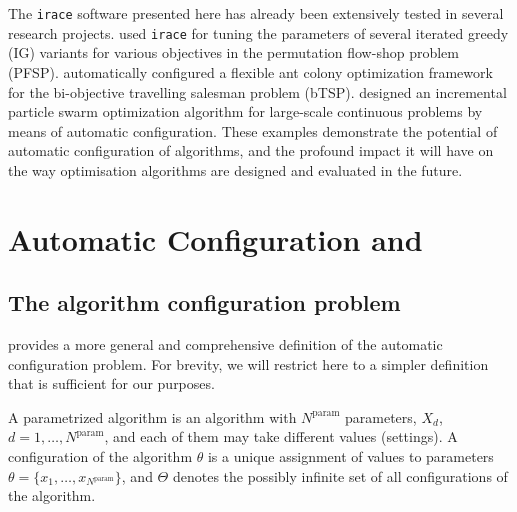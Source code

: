 \documentclass[a4paper]{article}
\newcommand{\irace}{\texttt{irace}\xspace}
\newcommand{\IFRACE}{\text{I/F-Race}\xspace}
\newcommand{\Nparam}{\ensuremath{{N^\text{param}}}\xspace}
\begin{document}
The \irace software presented here has already been extensively tested
in several research projects. \citet{IRIDIA-2010-022,DubLopStu2011cor}
used \irace for tuning the parameters of several iterated greedy (IG)
variants for various objectives in the permutation flow-shop problem
(PFSP). \citet{LopStu2010:ants} automatically configured a flexible
ant colony optimization framework for the bi-objective travelling salesman
problem (bTSP). \citet{MonAydStu2011soco} designed an incremental particle swarm optimization algorithm for large-scale continuous problems by means of automatic configuration.
%
These examples demonstrate the potential of automatic configuration of
algorithms, and the profound impact it will have on the way
optimisation algorithms are designed and evaluated in the future.


\section{Automatic Configuration and \IFRACE}\label{sec:prelim}

\subsection{The algorithm configuration problem}\label{sec:algoconf}

\citet{Birattari09tuning} provides a more general and comprehensive
definition of the automatic configuration problem. For brevity, we
will restrict here to a simpler definition that is sufficient for our
purposes.

A parametrized algorithm is an algorithm with $\Nparam$ parameters, $X_d$,
$d=1,\dotsc,\Nparam$, and each of them may take different values (settings).
A configuration of the algorithm $\theta$ is a unique assignment of
values to parameters $\theta=\{x_1,\dotsc,x_\Nparam\}$, and $\Theta$
denotes the possibly infinite set of all configurations of the
algorithm.
\end{document}
